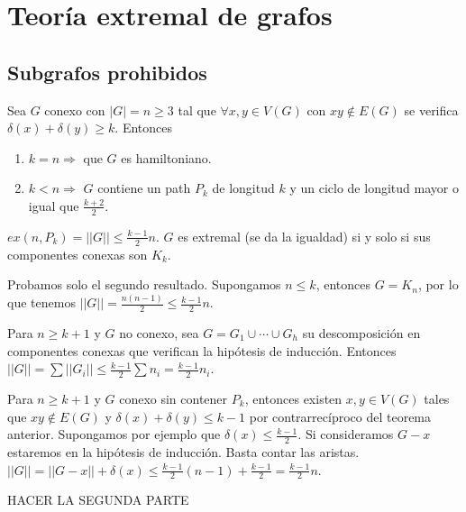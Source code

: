 \documentclass[TGyGC.tex]{subfiles}
\begin{document}
\chapter{Teoría extremal de grafos}
\section{Subgrafos prohibidos}
\begin{teorema}
Sea $G$ conexo con $|G|=n\geq 3$ tal que $\forall x, y\in V(G)$ con $xy\notin E(G)$ se verifica $\delta(x)+\delta(y)\geq k$. Entonces 

\begin{enumerate}
\item $k=n\Rightarrow$ que $G$ es hamiltoniano.
\item $k<n\Rightarrow$ $G$ contiene un path $P_k$ de longitud $k$ y un ciclo de longitud mayor o igual que $\frac{k+2}{2}$. 
\end{enumerate}
\end{teorema}

\begin{teorema}
$ex(n,P_k)=||G||\leq\frac{k-1}{2}n$. $G$ es extremal (se da la igualdad) si y solo si sus componentes conexas son $K_k$. 
\end{teorema}

\begin{dem}
Probamos solo el segundo resultado. Supongamos $n\leq k$, entonces $G=K_n$, por lo que tenemos $||G||=\frac{n(n-1)}{2}\leq\frac{k-1}{2}n$.

Para $n\geq k+1$ y $G$ no conexo, sea $G=G_1\cup\cdots \cup G_h$ su descomposición en componentes conexas que verifican la hipótesis de inducción. Entonces $||G||=\sum||G_i||\leq\frac{k-1}{2}\sum n_i=\frac{k-1}{2}n_i$.

Para $n\geq k+1$ y $G$ conexo sin contener $P_k$, entonces existen $x,y\in V(G)$ tales que $xy\notin E(G)$ y $\delta(x)+\delta(y)\leq k-1$ por contrarrecíproco del teorema anterior. Supongamos por ejemplo que $\delta(x)\leq\frac{k-1}{2}$. Si consideramos $G-x$ estaremos en la hipótesis de inducción. Basta contar las aristas. $||G||=||G-x||+\delta(x)\leq\frac{k-1}{2}(n-1)+\frac{k-1}{2}=\frac{k-1}{2}n$.

HACER LA SEGUNDA PARTE



\end{dem}
\end{document}
